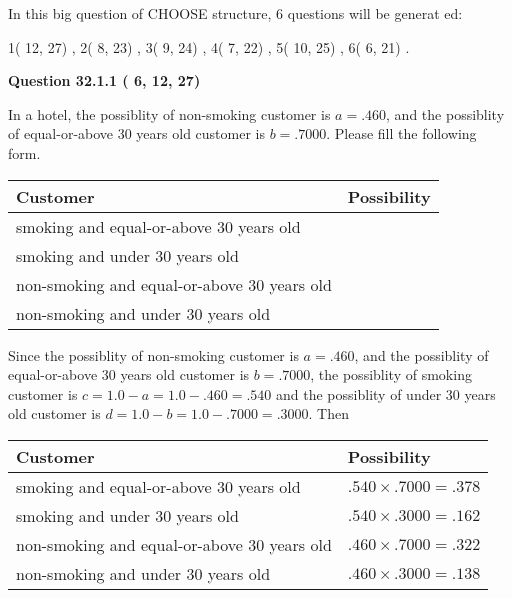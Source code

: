 \documentclass[12pt]{article}
\begin{document}
   
\vspace{0.2in}
   
 In this big question of CHOOSE structure,           6 questions will be generat
 ed: 
  
  
            1(         12,         27)
 ,
            2(          8,         23)
 ,
            3(          9,         24)
 ,
            4(          7,         22)
 ,
            5(         10,         25)
 ,
            6(          6,         21)
 .
  
\vspace{0.2in}
  
{\textbf{\Large{Question
32.1.1 
 (          6,         12,         27)
}}}
  
  
In a hotel, the possiblity of  %
non-smoking customer is
$a =  %
.460$, and the possiblity of  %
equal-or-above 30 years old customer is $ b =  %
.7000$.
Please fill the following form.
 
\noindent
\begin{tabular}{|l|l|}
\hline
Customer & Possibility \\
\hline
smoking  and   %
equal-or-above 30 years old  & \\
\hline
smoking  and   %
under 30 years old & \\
\hline
 non-smoking and   %
equal-or-above 30 years old  & \\
\hline
 non-smoking and  %
under 30 years old & \\
\hline
\end{tabular}
 
 
 
 
 
\noindent{}
 
 

Since the possiblity of  %
 non-smoking customer is $ a =  %
.460 $,
and the possiblity of  %
equal-or-above 30 years old customer is $ b =  %
.7000 $,
the possiblity of  %
smoking customer is $ c = 1.0 - a = 1.0 -
.460
=  %
.540 $ and the possiblity of  %
under 30 years old
customer is $ d = 1.0 - b = 1.0 -  %
.7000 =  %
.3000  $.
Then
 
\noindent
\begin{tabular}{|l|l|}
\hline
Customer & Possibility \\
\hline
smoking  and  %
equal-or-above 30 years old  &
  $ %
.540 \times  %
.7000 =  %
.378$ \\
\hline
smoking  and  %
under 30 years old &
  $ %
.540 \times  %
.3000 =  %
.162$ \\
\hline
 non-smoking and  %
equal-or-above 30 years old  &
  $ %
.460 \times  %
.7000 =  %
.322$ \\
\hline
 non-smoking and  %
under 30 years old &
  $ %
.460 \times  %
.3000 =  %
.138$ \\
\hline
\end{tabular}
 
\end{document}

